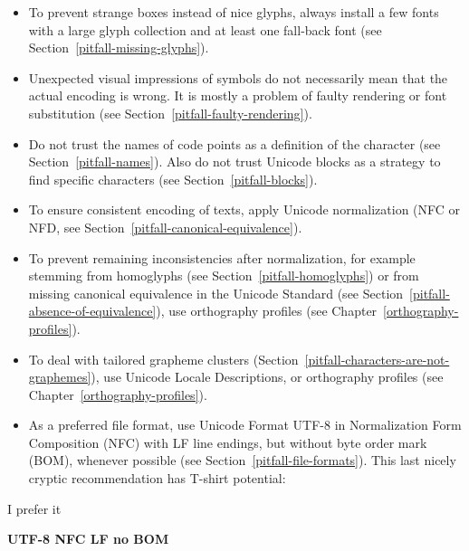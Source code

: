\begin{itemize}
   \item To prevent strange boxes instead of nice glyphs, always install a few
         fonts with a large glyph collection and at least one fall-back font
         (see Section~\ref{pitfall-missing-glyphs}).
   \item Unexpected visual impressions of symbols do not necessarily mean that
         the actual encoding is wrong. It is mostly a problem of faulty
         rendering or font substitution (see Section~\ref{pitfall-faulty-rendering}).
   \item Do not trust the names of code points as a definition of the character
         (see Section~\ref{pitfall-names}). Also do not trust Unicode blocks as
         a strategy to find specific characters (see
         Section~\ref{pitfall-blocks}).
   \item To ensure consistent encoding of texts, apply Unicode normalization
         (NFC or NFD, see Section~\ref{pitfall-canonical-equivalence}).
   \item To prevent remaining inconsistencies after normalization, for example 
         stemming from homoglyphs (see Section~\ref{pitfall-homoglyphs}) 
         or from missing canonical equivalence in the Unicode Standard
         (see Section~\ref{pitfall-absence-of-equivalence}), 
         use orthography profiles (see Chapter~\ref{orthography-profiles}).
   \item To deal with tailored grapheme clusters
         (Section~\ref{pitfall-characters-are-not-graphemes}), use Unicode Locale 
         Descriptions, or orthography profiles 
         (see Chapter~\ref{orthography-profiles}).
   \item As a preferred file format, use Unicode Format UTF-8 in 
         Normalization Form Composition (NFC) with LF line endings, 
         but without byte order mark (BOM), whenever possible (see 
         Section~\ref{pitfall-file-formats}). This last nicely cryptic 
         recommendation has T-shirt potential:
  
\end{itemize}

\begin{center}
  I prefer it
  
  \textbf{UTF-8 NFC LF no BOM}
\end{center}


